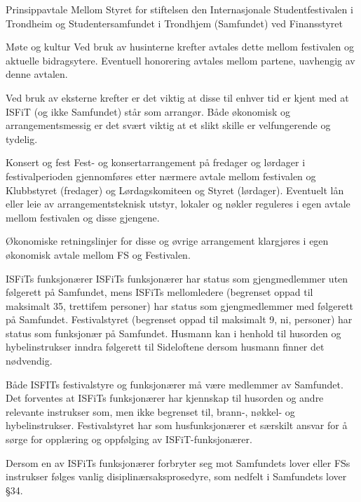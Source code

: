 \begin{instruks*}{Prinsippavtale Mellom Styret for stiftelsen den Internasjonale Studentfestivalen i
        Trondheim og Studentersamfundet i Trondhjem (Samfundet) ved Finansstyret}
    \begin{instruksledd}{Møte og kultur}
        Ved bruk av husinterne krefter avtales dette mellom festivalen og aktuelle bidragsytere. Eventuell
        honorering avtales
        mellom partene, uavhengig av denne avtalen.

        Ved bruk av eksterne krefter er det viktig at disse til enhver tid er kjent med at ISFiT (og ikke
        Samfundet) står som
        arrangør. Både økonomisk og arrangementsmessig er det svært viktig at et slikt skille er
        velfungerende og tydelig.
    \end{instruksledd}

    \begin{instruksledd}{Konsert og fest}
        Fest- og konsertarrangement på fredager og lørdager i festivalperioden gjennomføres etter nærmere
        avtale mellom
        festivalen og Klubbstyret (fredager) og Lørdagskomiteen og Styret (lørdager). Eventuelt lån eller
        leie av
        arrangementsteknisk utstyr, lokaler og nøkler reguleres i egen avtale mellom festivalen og disse
        gjengene.

        Økonomiske retningslinjer for disse og øvrige arrangement klargjøres i egen økonomisk avtale mellom
        FS og
        Festivalen.
    \end{instruksledd}

    \begin{instruksledd}{ISFiTs funksjonærer} 
        ISFiTs funksjonærer har status som gjengmedlemmer uten følgerett på Samfundet, mens ISFiTs
        mellomledere
        (begrenset oppad til maksimalt 35, trettifem personer) har status som gjengmedlemmer med følgerett
        på Samfundet.
        Festivalstyret (begrenset oppad til maksimalt 9, ni, personer) har status som funksjonær på
        Samfundet. Husmann kan i
        henhold til husorden og hybelinstrukser inndra følgerett til Sideloftene dersom husmann finner det
        nødvendig.

        Både ISFITs festivalstyre og funksjonærer må være medlemmer av Samfundet. Det forventes at ISFiTs
        funksjonærer
        har kjennskap til husorden og andre relevante instrukser som, men ikke begrenset til, brann-,
        nøkkel- og
        hybelinstrukser. Festivalstyret har som husfunksjonærer et særskilt ansvar for å sørge for opplæring
        og oppfølging av
        ISFiT-funksjonærer.

        Dersom en av ISFiTs funksjonærer forbryter seg mot Samfundets lover eller FSs instrukser følges
        vanlig
        disiplinærsaksprosedyre, som nedfelt i Samfundets lover §34.


\end{instruksledd}
\end{instruks*}
